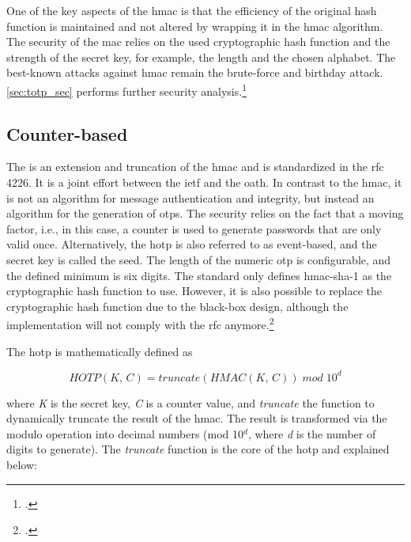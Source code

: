 One of the key aspects of the \gls{hmac} is that the efficiency of the original hash function is maintained and not altered by wrapping it in the \gls{hmac} algorithm. The security of the \gls{mac} relies on the used cryptographic hash function and the strength of the secret key, for example, the length and the chosen alphabet. The best-known attacks against \gls{hmac} remain the brute-force and birthday attack. \autoref{sec:totp_sec} performs further security analysis.\footcites[See][Chapter 10.4.1]{2308830}[See][398]{1679747}[See][3, 10--13]{10.1007/3-540-68697-5_1}[See][]{10.1007/3-540-44750-4_1}

\subsection{Counter-based}
\label{subsec:hotp}

The  is an extension and truncation of the \gls{hmac} and is standardized in the \gls{rfc} 4226. It is a joint effort between the \gls{ietf} and the \gls{oath}. In contrast to the \gls{hmac}, it is not an algorithm for message authentication and integrity, but instead an algorithm for the generation of \glspl{otp}. The security relies on the fact that a \frqq moving factor\flqq, i.e., in this case, a counter is used to generate passwords that are only valid once. Alternatively, the \gls{hotp} is also referred to as event-based, and the secret key is called the seed. The length of the numeric \gls{otp} is configurable, and the defined minimum is six digits. The standard only defines \gls{hmac}-\gls{sha}-1 as the cryptographic hash function to use. However, it is also possible to replace the cryptographic hash function due to the black-box design, although the implementation will not comply with the \gls{rfc} anymore.\footcites[See][]{m2005rfc}[See][Chapter 3]{9781849287333}

The \gls{hotp} is mathematically defined as

\begin{equation*}
	HOTP(K,\, C) = truncate(HMAC(K,\, C))\; mod \; 10^d
\end{equation*}

where \textit{K} is the secret key, \textit{C} is a counter value, and \textit{truncate} the function to dynamically truncate the result of the \gls{hmac}. The result is transformed via the modulo operation into decimal numbers 	(mod 10$^d$, where \textit{d} is the number of digits to generate). The \textit{truncate} function is the core of the \gls{hotp} and explained below:

